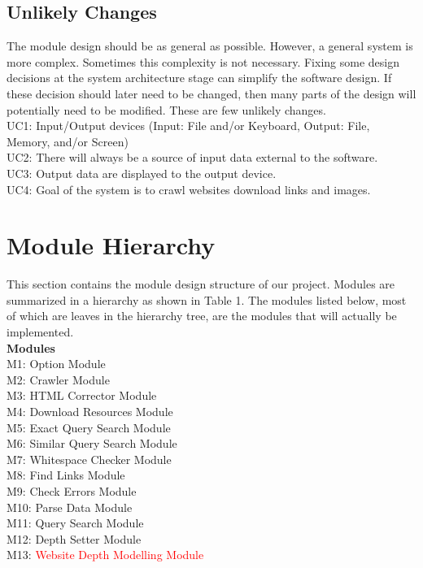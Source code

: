 \documentclass[titlepage]{article}
\begin{document}
\subsection{Unlikely Changes}
The module design should be as general as possible. However, a general system is more complex. Sometimes this complexity is not necessary. Fixing some design decisions at the system architecture stage can simplify the software design. If these decision should later need to be changed, then many parts of the design will potentially need to be modified.
These are few unlikely changes.\\

\noindent
UC1: Input/Output devices (Input: File and/or Keyboard, Output: File, Memory, and/or
Screen)\\
UC2: There will always be a source of input data external to the software.\\
UC3: Output data are displayed to the output device.\\
UC4: Goal of the system is to crawl websites download links and images.\\

\section{Module Hierarchy}
This section contains the module design structure of our project. Modules are summarized in a hierarchy as shown in Table 1. The modules listed below, most of which are leaves in the hierarchy tree, are the modules that will actually be implemented.
\\

\textbf{Modules}\\

\noindent
M1: Option Module\\
M2: Crawler Module\\
M3: HTML Corrector Module\\
M4: Download Resources Module\\
M5: Exact Query Search Module\\
M6: Similar Query Search Module\\
M7: Whitespace Checker Module\\
M8: Find Links Module\\
M9: Check Errors Module\\
M10: Parse Data Module\\
M11: Query Search Module\\
M12: Depth Setter Module\\
M13: \textcolor{red}{Website Depth Modelling Module}\\
\end{document}
